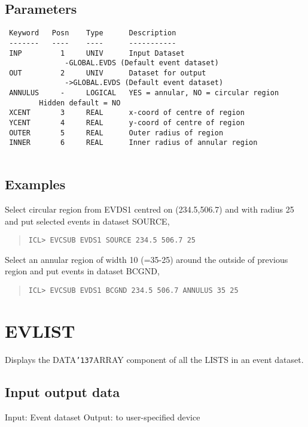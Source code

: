 \documentclass{book}
\renewcommand{\_}{{\tt\char'137}}     %
\begin{document}
\subsection{Parameters}
\begin{verbatim}
 Keyword   Posn    Type      Description
 -------   ----    ----      -----------
 INP         1     UNIV      Input Dataset
              -GLOBAL.EVDS (Default event dataset)
 OUT         2     UNIV      Dataset for output
              ->GLOBAL.EVDS (Default event dataset)
 ANNULUS     -     LOGICAL   YES = annular, NO = circular region
        Hidden default = NO
 XCENT       3     REAL      x-coord of centre of region
 YCENT       4     REAL      y-coord of centre of region
 OUTER       5     REAL      Outer radius of region
 INNER       6     REAL      Inner radius of annular region
 
\end{verbatim}\subsection{Examples}
Select circular region from EVDS1 centred on
(234.5,506.7) and with radius 25 and put selected
events in dataset SOURCE,
\begin{quote}\begin{verbatim}
ICL> EVCSUB EVDS1 SOURCE 234.5 506.7 25
\end{verbatim}\end{quote}
Select an annular region of width 10 (=35-25)
around the outside of previous region and put
events in dataset BCGND,
\begin{quote}\begin{verbatim}
ICL> EVCSUB EVDS1 BCGND 234.5 506.7 ANNULUS 35 25
\end{verbatim}\end{quote}
\section{EVLIST}
Displays the DATA\_ARRAY component of all the LISTS in an event
dataset.
 
\subsection{Input output data}
Input: Event dataset
Output: to user-specified device
\end{document}

